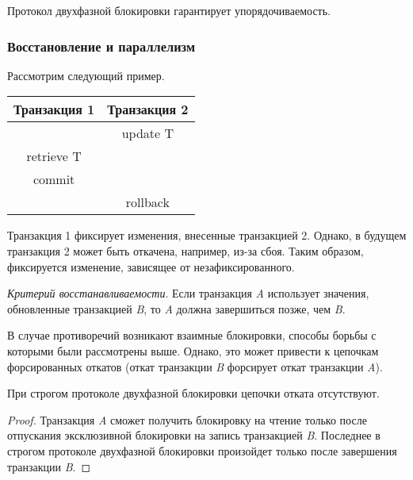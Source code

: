 \begin{proposition}
    Протокол двухфазной блокировки гарантирует упорядочиваемость.
\end{proposition}

\subsubsection{Восстановление и параллелизм}

Рассмотрим следующий пример.

\begin{center}
    \begin{tabular}{|c c|}
        \hline
        Транзакция 1 & Транзакция 2 \\
        \hline
        & update T \\
        retrieve T & \\
        commit & \\
        & rollback \\
        \hline
    \end{tabular}
\end{center}

Транзакция 1 фиксирует изменения, внесенные транзакцией 2. Однако, в будущем транзакция 2 может
быть откачена, например, из-за сбоя. Таким образом, фиксируется изменение, зависящее от
незафиксированного.

\begin{definition}
    \textit{Критерий восстанавливаемости}. Если транзакция \textit{A} использует значения,
    обновленные транзакцией \textit{B}, то \textit{A} должна завершиться позже, чем \textit{B}.
\end{definition}

В случае противоречий возникают взаимные блокировки, способы борьбы с которыми были рассмотрены
выше. Однако, это может привести к цепочкам форсированных откатов (откат транзакции \textit{B}
форсирует откат транзакции \textit{A}).

\begin{proposition}
    При строгом протоколе двухфазной блокировки цепочки отката отсутствуют.
\end{proposition}

\begin{proof}
    Транзакция \textit{A} сможет получить блокировку на чтение только
    после отпускания эксклюзивной блокировки на запись транзакцией \textit{B}. Последнее в строгом
    протоколе двухфазной блокировки произойдет только после завершения транзакции \textit{B}.
\end{proof}

